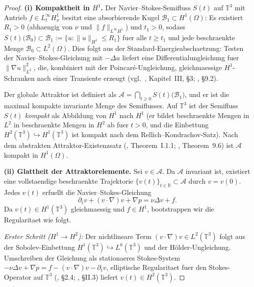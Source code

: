 \documentclass[12pt,a4paper]{article}
\theoremstyle{definition}
\theoremstyle{plain}
\theoremstyle{remark}
\begin{document}
\begin{proof}
\noindent\textbf{(i) Kompaktheit in $H^1$.}
Der Navier--Stokes-Semifluss $S(t)$ auf $\mathbb{T}^3$ mit Antrieb
$f \in L^\infty_t H^1_x$ besitzt eine absorbierende Kugel
$\mathcal{B}_1 \subset H^1(\Omega)$: Es existiert $R_1 > 0$ (abhaengig von
$\nu$ und $\|f\|_{L^\infty H^1}$) und $t_1 > 0$, sodass
$S(t)\bigl(\mathcal{B}_0\bigr) \subset \mathcal{B}_1 := \{u : \|u\|_{H^1} \le R_1\}$
fuer alle $t \ge t_1$ und jede beschraenkte Menge $\mathcal{B}_0 \subset L^2(\Omega)$.
Dies folgt aus der Standard-Energieabschaetzung: Testen der Navier--Stokes-Gleichung
mit $-\Delta u$ liefert eine Differentialungleichung fuer $\|\nabla u\|_{L^2}^2$,
die, kombiniert mit der Poincar\'{e}-Ungleichung, gleichmaessige $H^1$-Schranken
nach einer Transiente erzeugt (vgl.\ \cite{Temam2001}, Kapitel~III, \S3;
\cite{FoiasManleyRosaTemam2001}, \S9.2).

Der globale Attraktor ist definiert als
$\mathcal{A} = \bigcap_{t\ge 0} S(t)\bigl(\mathcal{B}_1\bigr)$, und er ist die
maximal kompakte invariante Menge des Semiflusses. Auf $\mathbb{T}^3$ ist der Semifluss
$S(t)$ \emph{kompakt} als Abbildung von $H^1$ nach $H^1$ (er bildet beschraenkte
Mengen in $L^2$ in beschraenkte Mengen in $H^2$ ab fuer $t > 0$, und die Einbettung
$H^2(\mathbb{T}^3) \hookrightarrow H^1(\mathbb{T}^3)$ ist kompakt nach dem
Rellich--Kondrachov-Satz). Nach dem abstrakten Attraktor-Existenzsatz
(\cite{Temam2001}, Theorem~I.1.1; \cite{FoiasManleyRosaTemam2001}, Theorem~9.6)
ist $\mathcal{A}$ kompakt in $H^1(\Omega)$.

\medskip
\noindent\textbf{(ii) Glattheit der Attraktorelemente.}
Sei $v \in \mathcal{A}$. Da $\mathcal{A}$ invariant ist, existiert eine
vollstaendige beschraenkte Trajektorie $\{v(t)\}_{t\in\mathbb{R}} \subset \mathcal{A}$
durch $v = v(0)$. Jedes $v(t)$ erfuellt die Navier--Stokes-Gleichung
\[
    \partial_t v + (v\cdot\nabla)v + \nabla p = \nu\Delta v + f.
\]
Da $v(t) \in H^1(\mathbb{T}^3)$ gleichmaessig und $f \in H^1$, bootstrappen wir
die Regularitaet wie folgt.

\emph{Erster Schritt ($H^1 \to H^2$):} Der nichtlineare Term
$(v\cdot\nabla)v \in L^2(\mathbb{T}^3)$ folgt aus der Sobolev-Einbettung
$H^1(\mathbb{T}^3) \hookrightarrow L^6(\mathbb{T}^3)$ und der H\"older-Ungleichung.
Umschreiben der Gleichung als stationaeres Stokes-System
$-\nu\Delta v + \nabla p = f - (v\cdot\nabla)v - \partial_t v$,
elliptische Regularitaet fuer den Stokes-Operator auf $\mathbb{T}^3$
(\cite{ConstantinFoias1988}, \S2.4; \cite{Temam2001}, \S II.3) liefert
$v(t) \in H^2(\mathbb{T}^3)$.


\end{proof}
\end{document}
